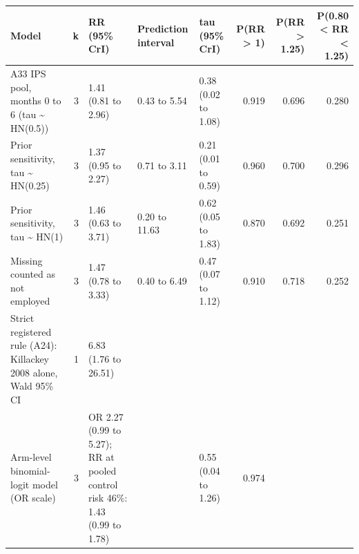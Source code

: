 
\begin{tabular}{p{4.6cm}rp{3.2cm}p{1.8cm}p{2.0cm}rrr}
\toprule
Model & k & RR (95\% CrI) & Prediction interval & tau (95\% CrI) & P(RR > 1) & P(RR > 1.25) & P(0.80 < RR < 1.25)\\
\midrule
A33 IPS pool, months 0 to 6 (tau \textasciitilde{} HN(0.5)) & 3 & 1.41 (0.81 to 2.96) & 0.43 to 5.54 & 0.38 (0.02 to 1.08) & 0.919 & 0.696 & 0.280\\
Prior sensitivity, tau \textasciitilde{} HN(0.25) & 3 & 1.37 (0.95 to 2.27) & 0.71 to 3.11 & 0.21 (0.01 to 0.59) & 0.960 & 0.700 & 0.296\\
Prior sensitivity, tau \textasciitilde{} HN(1) & 3 & 1.46 (0.63 to 3.71) & 0.20 to 11.63 & 0.62 (0.05 to 1.83) & 0.870 & 0.692 & 0.251\\
Missing counted as not employed & 3 & 1.47 (0.78 to 3.33) & 0.40 to 6.49 & 0.47 (0.07 to 1.12) & 0.910 & 0.718 & 0.252\\
Strict registered rule (A24): Killackey 2008 alone, Wald 95\% CI & 1 & 6.83 (1.76 to 26.51) &  &  &  &  & \\
Arm-level binomial-logit model (OR scale) & 3 & OR 2.27 (0.99 to 5.27); RR at pooled control risk 46\%: 1.43 (0.99 to 1.78) &  & 0.55 (0.04 to 1.26) & 0.974 &  & \\
\bottomrule
\end{tabular}
